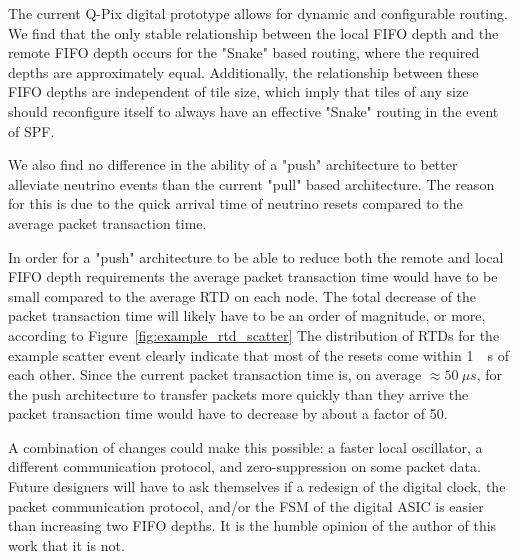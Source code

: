 The current Q-Pix digital prototype allows for dynamic and configurable routing. 
We find that the only stable relationship between the local FIFO depth and the remote FIFO depth occurs for the "Snake" based routing, where the required depths are approximately equal.
Additionally, the relationship between these FIFO depths are independent of tile size, which imply that tiles of any size should reconfigure itself to always have an effective "Snake" routing in the event of SPF.

We also find no difference in the ability of a "push" architecture to better alleviate neutrino events than the current "pull" based architecture.
The reason for this is due to the quick arrival time of neutrino resets compared to the average packet transaction time.

In order for a "push" architecture to be able to reduce both the remote and local FIFO depth requirements the average packet transaction time would have to be small compared to the average RTD on each node. 
The total decrease of the packet transaction time will likely have to be an order of magnitude, or more, according to Figure~\ref{fig:example_rtd_scatter}
The distribution of RTDs for the example scatter event clearly indicate that most of the resets come within 1~\unit{\mu s} of each other.
Since the current packet transaction time is, on average $\approx 50~\unit{\mu s}$, for the push architecture to transfer packets more quickly than they arrive the packet transaction time would have to decrease by about a factor of 50.

A combination of changes could make this possible: a faster local oscillator, a different communication protocol, and zero-suppression on some packet data.
Future designers will have to ask themselves if a redesign of the digital clock, the packet communication protocol, and/or the FSM of the digital ASIC is easier than increasing two FIFO depths.
It is the humble opinion of the author of this work that it is not.

